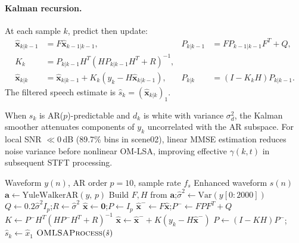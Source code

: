 \paragraph{Kalman recursion.}
At each sample $k$, predict then update:
\begin{align}
  \hat{\mathbf{x}}_{k|k-1} &= F\hat{\mathbf{x}}_{k-1|k-1}, &
  P_{k|k-1} &= F P_{k-1|k-1} F^T + Q, \\
  K_k &= P_{k|k-1} H^T (H P_{k|k-1} H^T + R)^{-1}, \\
  \hat{\mathbf{x}}_{k|k} &= \hat{\mathbf{x}}_{k|k-1} + K_k (y_k - H\hat{\mathbf{x}}_{k|k-1}), &
  P_{k|k} &= (I - K_k H) P_{k|k-1}.
  \label{eq:kalman_update}
\end{align}
The filtered speech estimate is $\hat{s}_k = (\hat{\mathbf{x}}_{k|k})_1$.

\begin{proposition}
\label{prop:kalman}
When $s_k$ is AR($p$)-predictable and $d_k$ is white with variance $\sigma_d^2$, the Kalman smoother attenuates components of $y_k$ uncorrelated with the AR subspace. For local SNR $\ll 0$\,dB (89.7\% bins in scene02), linear MMSE estimation reduces noise variance before nonlinear OM-LSA, improving effective $\gamma(k,t)$ in subsequent STFT processing.
\end{proposition}

\begin{algorithm}[H]
  \caption{Kalman--AR filter + OM-LSA (\texttt{kalman\_ar})}
  \label{alg:kalman_ar}
  \begin{algorithmic}[1]
    \Require Waveform $y(n)$, AR order $p=10$, sample rate $f_s$
    \Ensure Enhanced waveform $\hat{s}(n)$
    \State $\mathbf{a} \gets \mathrm{YuleWalkerAR}(y,\, p)$ 
    \State Build $F,H$ from $\mathbf{a}$;\quad $\hat{\sigma}^2 \gets \mathrm{Var}(y[0:2000])$
    \State $Q \gets 0.2\hat{\sigma}^2 I_p$;\quad $R \gets \hat{\sigma}^2$
    \State $\hat{\mathbf{x}} \gets \mathbf{0}$;\quad $P \gets I_p$
      \State $\hat{\mathbf{x}}^- \gets F\hat{\mathbf{x}}$;\quad $P^- \gets F P F^T + Q$
      \State $K \gets P^- H^T (H P^- H^T + R)^{-1}$ \Comment{\eqref{eq:kalman_update}}
      \State $\hat{\mathbf{x}} \gets \hat{\mathbf{x}}^- + K(y_k - H\hat{\mathbf{x}}^-)$
      \State $P \gets (I - K H) P^-$;\quad $\hat{s}_k \gets \hat{x}_1$
    \EndFor
    \State \Return $\textsc{OMLSAProcess}(\hat{s})$
  \end{algorithmic}
\end{algorithm}

